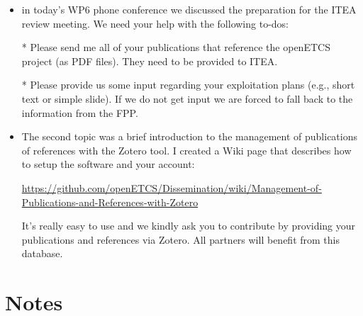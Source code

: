 \documentclass[a4paper, 11pt]{article}
\begin{document}
\begin{itemize}

\item in today's WP6 phone conference we discussed the preparation for the ITEA review meeting. We need your help with the following to-dos: 

* Please send me all of your publications that reference the openETCS project (as PDF files). They need to be provided to ITEA. 

* Please provide us some input regarding your exploitation plans (e.g., short text or simple slide). If we do not get input we are forced to fall back to the information from the FPP. 

\item The second topic was a brief introduction to the management of publications of references with the Zotero tool. I created a Wiki page that describes how to setup the software and your account: 

\url{https://github.com/openETCS/Dissemination/wiki/Management-of-Publications-and-References-with-Zotero }

It's really easy to use and we kindly ask you to contribute by providing your publications and references via Zotero. All partners will benefit from this database. 


\end{itemize}

\section{Notes}
\end{document}
